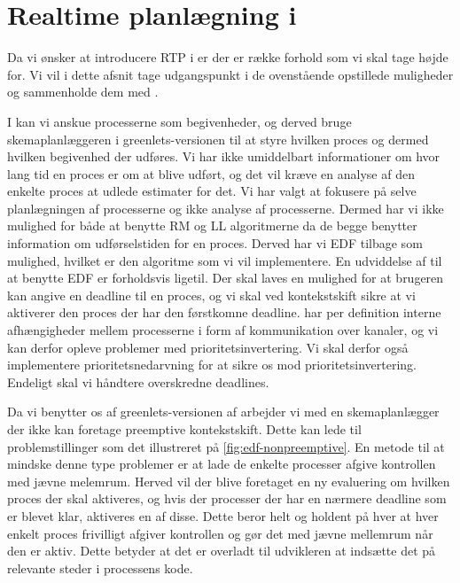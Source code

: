 \section{Realtime planlægning i \pycsp}
\label{sec:rtp-pycsp}

Da vi ønsker at introducere RTP i \pycsp er der er række forhold som vi skal tage højde for. Vi vil i dette afsnit tage udgangspunkt i de ovenstående opstillede muligheder og sammenholde dem med \pycsp. 

I \pycsp kan vi anskue processerne som begivenheder, og derved bruge skemaplanlæggeren i greenlets-versionen til at styre hvilken proces og dermed hvilken begivenhed der udføres. Vi har ikke umiddelbart informationer om hvor lang tid en proces er om at blive udført, og det vil kræve en analyse af den enkelte proces at udlede estimater for det. Vi har valgt at fokusere på selve planlægningen af processerne og ikke analyse af processerne. Dermed har vi ikke mulighed for både at benytte RM og LL algoritmerne da de begge benytter information om udførselstiden for en proces. Derved har vi EDF tilbage som mulighed, hvilket er den algoritme som vi vil implementere. En udviddelse af \pycsp til at benytte EDF er forholdsvis ligetil. Der skal laves en mulighed for at brugeren kan angive en deadline til en proces, og vi skal ved kontekstskift sikre at vi aktiverer den proces der har den førstkomne deadline. \pycsp har per definition interne afhængigheder mellem processerne i form af kommunikation over kanaler, og vi kan derfor opleve problemer med prioritetsinvertering. Vi skal derfor også implementere prioritetsnedarvning for at sikre os mod prioritetsinvertering. Endeligt skal vi håndtere overskredne deadlines. 

Da vi benytter os af greenlets-versionen af \pycsp arbejder vi med en skemaplanlægger der ikke kan foretage preemptive kontekstskift. Dette kan lede til problemstillinger som det illustreret på \cref{fig:edf-nonpreemptive}. En metode til at mindske denne type problemer er at lade de enkelte processer afgive kontrollen med jævne melemrum. Herved vil der blive foretaget en ny evaluering om hvilken proces der skal aktiveres, og hvis der processer der har en nærmere deadline som er blevet klar, aktiveres en af disse. Dette beror helt og holdent på hver at hver enkelt proces frivilligt afgiver kontrollen og gør det med jævne mellemrum når den er aktiv. Dette betyder at det er overladt til udvikleren at indsætte det på relevante steder i processens kode. 



